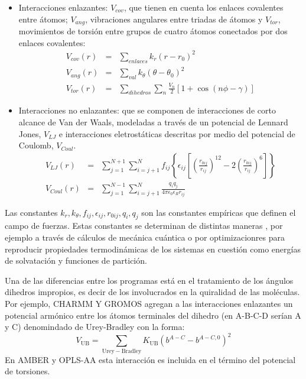 \begin{itemize}
\item Interacciones enlazantes: $V_{cov}$, que tienen en cuenta los enlaces covalentes entre \'{a}tomos; $V_{ang}$, vibraciones angulares entre triadas de \'{a}tomos y $V_{tor}$, movimientos de torsi\'{o}n entre grupos de cuatro \'{a}tomos conectados por dos enlaces covalentes:
\begin{eqnarray}\label{eq:3}
V_{cov}(r)&=&\sum_{enlaces}k_r\left(r-r_0\right)^2\\
V_{ang}(r)&=&\sum_{val}k_\theta\left(\theta-\theta_{0}\right)^2\\
V_{tor}(r)&=&\sum_{dihedros}\sum_{n}\frac{V_n}{2}\left[1+\cos(n\phi-\gamma)\right]
\end{eqnarray}
\item Interacciones no enlazantes: que se componen de interacciones de corto alcance de Van der Waals, modeladas a trav\'{e}s de un potencial de Lennard Jones, $V_{LJ}$ e interacciones eletrost\'{a}ticas descritas por medio del potencial de Coulomb, $V_{Coul}$.
\begin{eqnarray}\label{eq:4}
V_{LJ}(r)&=&\sum_{j=1}^{N+1}\sum_{i=j+1}^N f_{ij}\left\{\epsilon_{ij}\left[\left(\frac{r_{0ij}}{r_{ij}}\right)^{12}-2\left(\frac{r_{0ij}}{r_{ij}}\right)^6\right]\right\}\\
V_{Coul}(r)&=&\sum_{j=1}^{N-1}\sum_{i=j+1}^{N}\frac{q_iq_j}{4\pi\epsilon_0\epsilon_R r_{ij}}
\end{eqnarray}
\end{itemize}
Las constantes $k_r,k_\theta,f_{ij},\epsilon_{ij},r_{0ij},q_{i},q_{j}$ son las constantes emp\'{i}ricas que definen el campo de fuerzas. Estas constantes se determinan de distintas maneras , por ejemplo a trav\'{e}s de c\'{a}lculos de mec\'{a}nica cu\'{a}ntica o por optimizacionres para reproducir propiedades termodin\'{a}micas de los sistemas en cuesti\'{o}n como energ\'{i}as de solvataci\'{o}n y funciones de partici\'{o}n.

Una de las diferencias entre los programas est\'{a} en el tratamiento de los \'{a}ngulos dihedros impropios, es decir de los involucrados en la quiralidad de las mol\'{e}culas. Por ejemplo, CHARMM Y GROMOS agregan a las interacciones enlazantes un potencial arm\'{o}nico entre los \'{a}tomos terminales del dihedro (en A-B-C-D ser\'{i}an A y C) denomindado de Urey-Bradley con la forma:
\begin{equation}\label{eq:5}
    V_{\mathrm{UB}}=\sum_{\mathrm{Urey-Bradley}} K_{\mathrm{UB}}(b^{A-C}-b^{A-C,0})^2
\end{equation}
En AMBER y OPLS-AA esta interacci\'{o}n es incluida en el t\'{e}rmino del potencial de torsiones.\\

